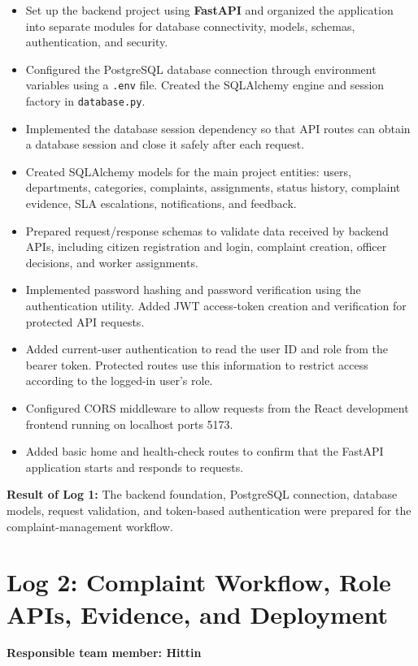 \documentclass[12pt,a4paper]{article}
\begin{document}
\begin{itemize}
    \item Set up the backend project using \textbf{FastAPI} and organized the application into separate modules for database connectivity, models, schemas, authentication, and security.
    \item Configured the PostgreSQL database connection through environment variables using a \texttt{.env} file. Created the SQLAlchemy engine and session factory in \texttt{database.py}.
    \item Implemented the database session dependency so that API routes can obtain a database session and close it safely after each request.
    \item Created SQLAlchemy models for the main project entities: users, departments, categories, complaints, assignments, status history, complaint evidence, SLA escalations, notifications, and feedback.
    \item Prepared request/response schemas to validate data received by backend APIs, including citizen registration and login, complaint creation, officer decisions, and worker assignments.
    \item Implemented password hashing and password verification using the authentication utility. Added JWT access-token creation and verification for protected API requests.
    \item Added current-user authentication to read the user ID and role from the bearer token. Protected routes use this information to restrict access according to the logged-in user's role.
    \item Configured CORS middleware to allow requests from the React development frontend running on localhost ports 5173.
    \item Added basic home and health-check routes to confirm that the FastAPI application starts and responds to requests.
\end{itemize}

\textbf{Result of Log 1:} The backend foundation, PostgreSQL connection, database models, request validation, and token-based authentication were prepared for the complaint-management workflow.

\section{Log 2: Complaint Workflow, Role APIs, Evidence, and Deployment}
\textbf{Responsible team member: Hittin}
\end{document}

